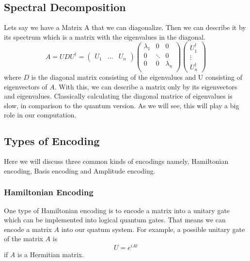 \subsection{Spectral Decomposition}
Lets say we have a Matrix A that we can diagonalize. 
Then we can describe it by its spectrum which is a matrix with the eigenvalues in the diagonal.
\begin{equation} 
A =  U D U^{\dagger} = \begin{pmatrix} U_1 & \dots & U_n \end{pmatrix} \begin{pmatrix} \lambda_1 & 0 & 0 \\  0 & \ddots & 0\\ 0 & 0& \lambda_n \\ \end{pmatrix} \begin{pmatrix} U^\dagger_1 \\ \vdots \\ U^\dagger_n \end{pmatrix}
\end{equation}
where $D$ is the diagonal matrix consisting of the eigenvalues and U consisting of eigenvectors of $A$.
With this, we can describe a matrix only by its eigenvectors and eigenvalues. 
Classically calculating the diagonal matrice of eigenvalues is slow, in comparison to the quantum version. 
As we will see, this will play a big role in our computation. 

\subsection{Types of Encoding}
Here we will discuss three common kinds of encodings namely, Hamiltonian encoding, Basis encoding and Amplitude encoding.

\subsubsection{Hamiltonian Encoding}
One type of Hamiltonian encoding is to encode a matrix into a unitary gate which can be implemented into logical quantum gates. 
That means we can encode a matrix $A$ into our quatum system.
For example, a possible unitary gate of the matrix $A$ is
\begin{equation}
    U = e^{iAt}
\end{equation}
if $A$ is a Hermitian matrix.

